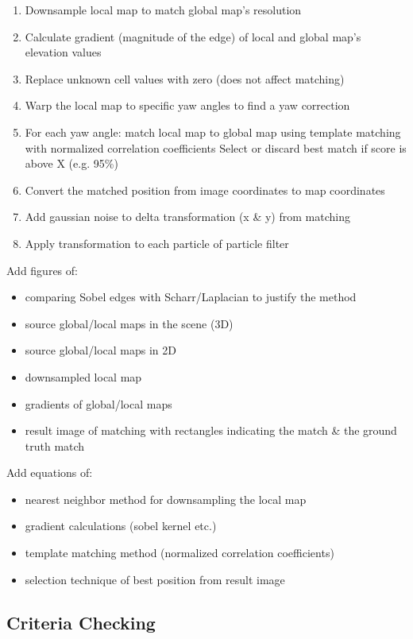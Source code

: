 \begin{enumerate}
    \item Downsample local map to match global map's resolution
    \item Calculate gradient (magnitude of the edge) of local and global map's elevation values
    \item Replace unknown cell values with zero (does not affect matching)
    \item Warp the local map to specific yaw angles to find a yaw correction
    \item For each yaw angle: match local map to global map using template matching with normalized correlation coefficients
 Select or discard best match if score is above X (e.g. 95\%)
    \item Convert the matched position from image coordinates to map coordinates
    \item Add gaussian noise to delta transformation (x \& y) from matching
    \item Apply transformation to each particle of particle filter
\end{enumerate}

\noindent
Add figures of:
\begin{itemize}
    \item comparing Sobel edges with Scharr/Laplacian to justify the method
    \item source global/local maps in the scene (3D)
    \item source global/local maps in 2D
    \item downsampled local map
    \item gradients of global/local maps
    \item result image of matching with rectangles indicating the match \& the ground truth match
\end{itemize}

\noindent
Add equations of:
\begin{itemize}
    \item nearest neighbor method for downsampling the local map
    \item gradient calculations (sobel kernel etc.)
    \item template matching method (normalized correlation coefficients)
    \item selection technique of best position from result image
\end{itemize}

\subsection{Criteria Checking}

